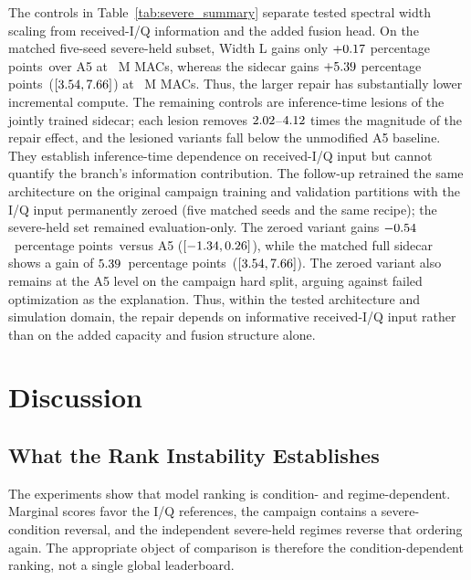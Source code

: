 \documentclass[letterpaper,journal]{IEEEtran}
\newcommand{\pp}{percentage points}
\begin{document}
The controls in Table~\ref{tab:severe_summary} separate tested
spectral width scaling from received-I/Q information and the added fusion
head. On the matched five-seed severe-held subset, Width L gains only
$+0.17$ \pp\ over A5 at \CapacityLMacs\ M MACs, whereas the
sidecar gains $+5.39$ \pp\
($[3.54,7.66]$) at
\SidecarMacsTotal\ M MACs. Thus, the larger repair has substantially lower
incremental compute. The remaining controls are
inference-time lesions of the jointly trained sidecar; each lesion removes
$2.02$--$4.12$
times the magnitude of the repair effect, and the lesioned variants fall
below the unmodified A5 baseline. They establish inference-time dependence
on received-I/Q input but cannot quantify the branch's information
contribution. The follow-up retrained the same architecture on the original
campaign training and validation partitions with the I/Q input permanently
zeroed (five matched seeds and the same recipe); the severe-held set remained
evaluation-only. The zeroed variant gains
$-0.54$~\pp\ versus A5
($[-1.34,0.26]$), while the
matched full sidecar shows a gain of $5.39$~\pp\
($[3.54,7.66]$). The zeroed variant
also remains at the A5 level on the campaign hard split, arguing against failed
optimization as the explanation. Thus, within the tested architecture and simulation
domain, the repair depends on informative received-I/Q input rather than on
the added capacity and fusion structure alone.

\section{Discussion}
\subsection{What the Rank Instability Establishes}
The experiments show that model ranking is condition- and regime-dependent.
Marginal scores favor the I/Q references, the campaign contains a
severe-condition reversal, and the independent severe-held regimes reverse
that ordering again. The appropriate object of comparison is therefore the
condition-dependent ranking, not a single global leaderboard.
\end{document}
